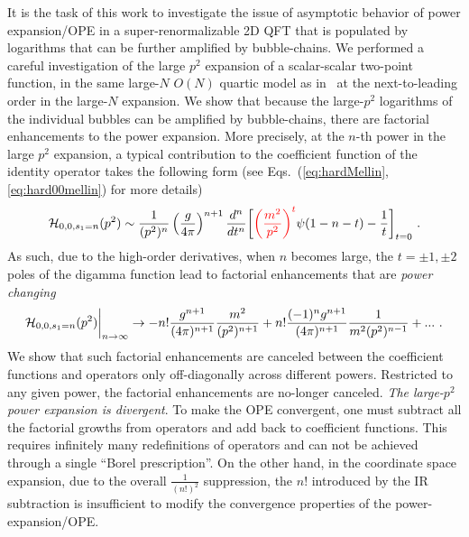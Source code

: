 \documentclass[a4paper,11pt]{article}
\begin{document}
It is the task of this work to investigate the issue of asymptotic behavior of power expansion/OPE in a super-renormalizable 2D QFT that is populated by logarithms that can be further amplified by bubble-chains. 
We performed a careful investigation of the large $p^2$ expansion of a scalar-scalar two-point function, in the same large-$N$ $O(N)$ quartic model as in~\cite{Marino:2019fvu}
at the next-to-leading order in the large-$N$ expansion. 
We show that because the large-$p^2$ logarithms of the individual bubbles can be amplified by bubble-chains, there are 
factorial enhancements to the power expansion. More precisely, at the $n$-th power in the large $p^2$ expansion, a typical contribution to the coefficient function of the identity operator takes the following form (see Eqs.~(\ref{eq:hardMellin}, \ref{eq:hard00mellin}) for more details)
\begin{align}
{\cal H}_{0,0,s_1=n}(p^2)\sim \frac{1}{(p^2)^n}\left(\frac{g}{4\pi}\right)^{n+1} \frac{d^n}{dt^n} \bigg[{\color{red}\left(\frac{m^2}{p^2}\right)^{t}} \psi(1-n-t)-\frac{1}{t}\bigg]_{t=0} \ .
\end{align}
As such, due to the high-order derivatives, when $n$ becomes large, the $t=\pm1,\pm2$ poles of the digamma function lead to factorial enhancements that are {\it power changing}
\begin{align}
{\cal H}_{0,0,s_1=n}(p^2)\bigg|_{n\rightarrow \infty}\rightarrow -n!\frac{g^{n+1}}{(4\pi)^{n+1}}\frac{m^2}{(p^2)^{n+1}}+n!\frac{(-1)^ng^{n+1}}{(4\pi)^{n+1}}\frac{1}{m^2(p^2)^{n-1}}+ ...\ .
\end{align}
We show that such factorial enhancements are canceled between the coefficient functions and operators only off-diagonally across different powers. Restricted to any given power, the factorial enhancements are no-longer canceled.  {\it The large-$p^2$ power expansion is divergent}.  To make the OPE convergent, one must subtract all the factorial growths from operators and add back to coefficient functions. This requires infinitely many redefinitions of operators and can not be achieved through a single ``Borel prescription''. On the other hand, in the coordinate space expansion, due to the overall $\frac{1}{(n!)^2}$ suppression, the $n!$ introduced by the IR subtraction is insufficient to modify the convergence properties of the power-expansion/OPE.
\end{document}
